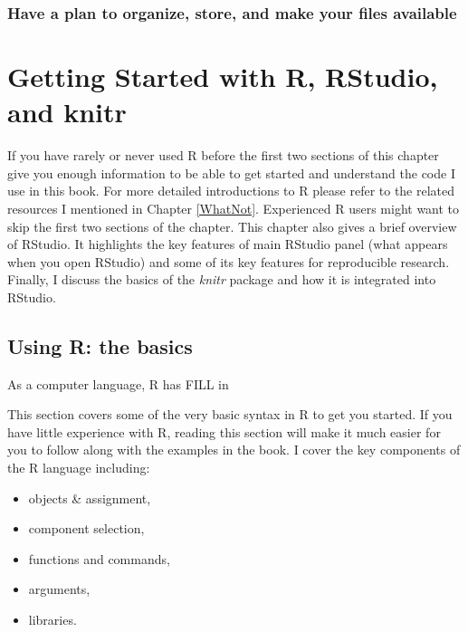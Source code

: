 \documentclass[ChapterTOCs,krantz1]{krantz}\usepackage{graphicx, color}
\begin{document}
\subsection{Have a plan to organize, store, and make your files available}





\chapter{Getting Started with R, RStudio, and knitr}\label{GettingStarted}

If you have rarely or never used R before the first two sections of this chapter give you enough information to be able to get started and understand the code I use in this book. For more detailed introductions to R please refer to the related resources I mentioned in Chapter \ref{WhatNot}. Experienced R users might want to skip the first two sections of the chapter. This chapter also gives a brief overview of RStudio. It highlights the key features of main RStudio panel (what appears when you open RStudio) and some of its key features for reproducible research. Finally, I discuss the basics of the {\emph{knitr}} package and how it is integrated into RStudio.

\section{Using R: the basics}

As a computer language, R has FILL in

This section covers some of the very basic syntax in R to get you started. If you have little experience with R, reading this section will make it much easier for you to follow along with the examples in the book. I cover the key components of the R language including:

\begin{itemize}
    \item objects \& assignment,
    \item component selection,
    \item functions and commands,
    \item arguments,
    \item libraries.
\end{itemize}
\end{document}
